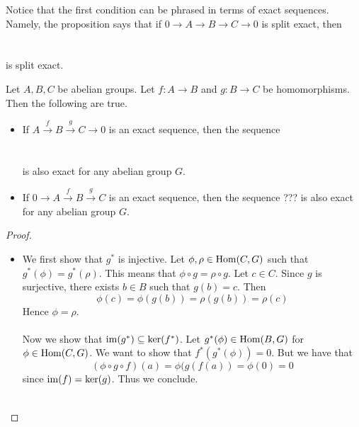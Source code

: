 \documentclass[a4paper]{article}
\begin{document}
Notice that the first condition can be phrased in terms of exact sequences. Namely, the proposition says that if $0\to A\to B\to C\to 0$ is split exact, then \\
\\~\\
is split exact. 

\begin{prp}{}{} Let $A,B,C$ be abelian groups. Let $f:A\to B$ and $g:B\to C$ be homomorphisms. Then the following are true.  
\begin{itemize}
\item If $A\overset{f}{\to} B\overset{g}{\to} C\to 0$ is an exact sequence, then the sequence \\
\\~\\
is also exact for any abelian group $G$. 
\item If $0\to A\overset{f}{\to} B\overset{g}{\to} C$ is an exact sequence, then the sequence ???
is also exact for any abelian group $G$. 
\end{itemize} \tcbline
\begin{proof}~\\
\begin{itemize}
\item We first show that $g^\ast$ is injective. Let $\phi,\rho\in\operatorname{Hom}(C,G)$ such that $g^\ast(\phi)=g^\ast(\rho)$. This means that $\phi\circ g=\rho\circ g$. Let $c\in C$. Since $g$ is surjective, there exists $b\in B$ such that $g(b)=c$. Then $$\phi(c)=\phi(g(b))=\rho(g(b))=\rho(c)$$ Hence $\phi=\rho$. \\~\\

Now we show that $\operatorname{im}(g^\ast)\subseteq\ker(f^\ast)$. Let $g^\ast(\phi)\in\operatorname{Hom}(B,G)$ for $\phi\in\operatorname{Hom}(C,G)$. We want to show that $f^\ast(g^\ast(\phi))=0$. But we have that $$(\phi\circ g\circ f)(a)=\phi(g(f(a))=\phi(0)=0$$ since $\operatorname{im}(f)=\ker(g)$. Thus we conclude. \\~\\


\end{itemize}
\end{proof}
\end{prp}
\end{document}
